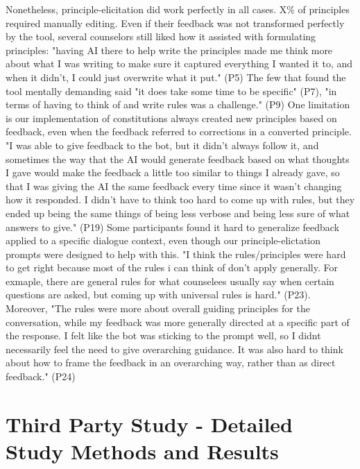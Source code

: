 \documentclass[11pt]{article}
\begin{document}
Nonetheless, principle-elicitation did work perfectly in all cases. X\% of principles required manually editing. Even if their feedback was not transformed perfectly by the tool, several counselors still liked how it assisted with formulating principles: "having AI there to help write the principles made me think more about what I was writing to make sure it captured everything I wanted it to, and when it didn't, I could just overwrite what it put." (P5) The few that found the tool mentally demanding said "it does take some time to be specific" (P7), "in terms of having to think of and write rules was a challenge." (P9)
One limitation is our implementation of constitutions always created new principles based on feedback, even when the feedback referred to corrections in a converted principle. 
"I was able to give feedback to the bot, but it didn't always follow it, and sometimes the way that the AI would generate feedback based on what thoughts I gave would make the feedback a little too similar to things I already gave, so that I was giving the AI the same feedback every time since it wasn't changing how it responded. I didn't have to think too hard to come up with rules, but they ended up being the same things of being less verbose and being less sure of what answers to give." (P19) Some participants found it hard to generalize feedback applied to a specific dialogue context, even though our principle-elictation prompts were designed to help with this. "I think the rules/principles were hard to get right because most of the rules i can think of don't apply generally. For exmaple, there are general rules for what counselees usually say when certain questions are asked, but coming up with universal rules is hard." (P23). Moreover, "The rules were more about overall guiding principles for the conversation, while my feedback was more generally directed at a specific part of the response. I felt like the bot was sticking to the prompt well, so I didnt necessarily feel the need to give overarching guidance. It was also hard to think about how to frame the feedback in an overarching way, rather than as direct feedback." (P24) 
\fi


\section{Third Party Study - Detailed Study Methods and Results}
\end{document}
